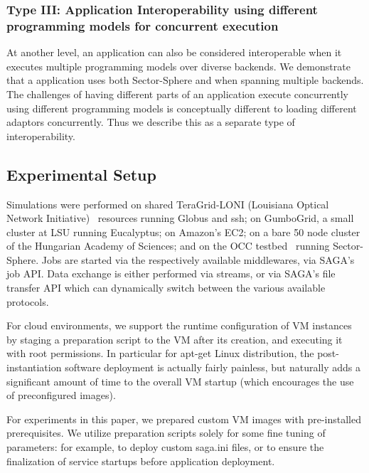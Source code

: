 \documentclass[3p,twocolumn]{elsarticle}
\begin{document}
\subsubsection{Type III: Application Interoperability using different
  programming models for concurrent execution}
%
%

At another level, an application can also be considered interoperable
when it executes multiple programming models  over
diverse backends.  We demonstrate that a \wc application uses both
Sector-Sphere and \smr when spanning  multiple backends.  The
challenges of having different parts of an application execute
concurrently using different programming models is conceptually
different to loading different adaptors concurrently. Thus we describe
this as a separate type of interoperability.

\subsection{Experimental Setup}

Simulations were performed on shared TeraGrid-LONI (Louisiana Optical
Network Initiative)~\cite{loni-url} resources running Globus and ssh;
on GumboGrid, a small cluster at LSU running Eucalyptus; on Amazon's
EC2; on a bare 50 node cluster of the Hungarian Academy of Sciences;
and on the OCC testbed~\cite{occ_testbed} running Sector-Sphere.  Jobs
are started via the respectively available middlewares, via SAGA's job
API.  Data exchange is either performed via streams, or via SAGA's
file transfer API which can dynamically switch between the various
available protocols.

For cloud environments, we support the runtime configuration of VM
instances by staging a preparation script to the VM after its
creation, and executing it with root permissions.  In particular for
apt-get Linux distribution, the post-instantiation software deployment
is actually fairly painless, but naturally adds a significant amount
of time to the overall VM startup (which encourages the use of
preconfigured images).

For experiments in this paper, we prepared custom VM images with
pre-installed prerequisites.  We utilize preparation scripts solely
for some fine tuning of parameters: for example, to deploy custom
saga.ini files, or to ensure the finalization of service startups
before application deployment.
\end{document}
